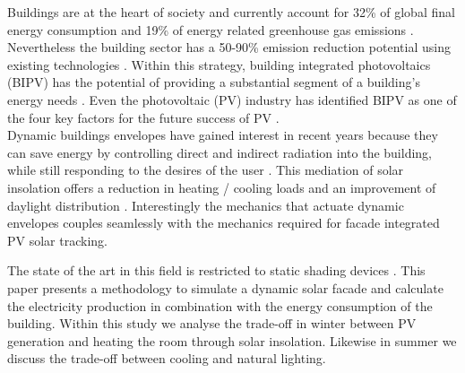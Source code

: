 
Buildings are at the heart of society and currently account for 32\% of global final energy consumption and 19\% of energy related greenhouse gas emissions \cite{IPCC}. Nevertheless the building sector has a 50-90\% emission reduction potential using existing technologies \cite{IPCC}. Within this strategy, building integrated photovoltaics (BIPV) has the potential of providing a substantial segment of a building's energy needs \cite{defaix2012technical}. Even the photovoltaic (PV) industry has identified BIPV as one of the four key factors for the future success of PV \cite{raugei2009life}. \\



Dynamic buildings envelopes have gained interest in recent years because they can save energy by controlling direct and indirect radiation into the building, while still responding to the desires of the user \cite{loonen2013climate}. This mediation of solar insolation offers a reduction in heating / cooling loads and an improvement of daylight distribution \cite{rossi2012adaptive}. Interestingly the mechanics that actuate dynamic envelopes couples seamlessly with the mechanics required for facade integrated PV solar tracking. 

The state of the art in this field is restricted to static shading devices \cite{yoo2011available} \cite{mandalaki2014assessment}. This paper presents a methodology to simulate a dynamic solar facade and calculate the electricity production in combination with the energy consumption of the building. Within this study we analyse the trade-off in winter between PV generation and heating the room through solar insolation. Likewise in summer we discuss the trade-off between cooling and natural lighting. 








